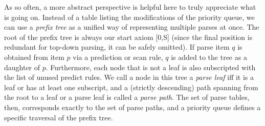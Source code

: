 As so often, a more abstract perspective is helpful here to truly appreciate what is going on.
Instead of a table listing the modifications of the priority queue, we can use a \emph{prefix tree} as a unified way of representing multiple parses at once.
The root of the prefix tree is always our start axiom [0,S] (since the final position is redundant for top-down parsing, it can be safely omitted).
If parse item $q$ is obtained from item $p$ via a prediction or scan rule, $q$ is added to the tree as a daughter of $p$.
Furthermore, each node that is not a leaf is also subscripted with the list of unused predict rules. 
We call a node in this tree a \emph{parse leaf} iff it is a leaf or has at least one subscript, and a (strictly descending) path spanning from the root to a leaf or a parse leaf is called a \emph{parse path}.
The set of parse tables, then, corresponds exactly to the set of parse paths, and a priority queue defines a specific traversal of the prefix tree.
%
